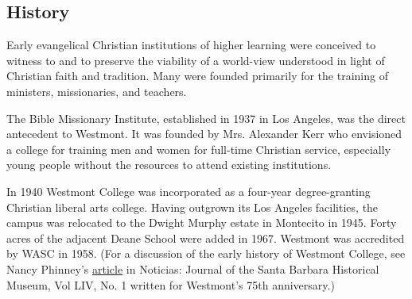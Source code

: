 \subsection{History}

   Early evangelical Christian institutions of higher learning were conceived to witness to and to preserve the viability of a world-view understood in light of Christian faith and tradition. Many were founded primarily for the training of ministers, missionaries, and teachers.

   The Bible Missionary Institute, established in 1937 in Los Angeles, was the direct antecedent to Westmont. It was founded by Mrs. Alexander Kerr who envisioned a college for training men and women for full-time Christian service, especially young people without the resources to attend existing institutions.

   In 1940 Westmont College was incorporated as a four-year degree-granting Christian liberal arts college. Having outgrown its Los Angeles facilities, the campus was relocated to the Dwight Murphy estate in Montecito in 1945. Forty acres of the adjacent Deane School were added in 1967. Westmont was accredited by WASC in 1958. (For a discussion of the early history of Westmont College, see Nancy Phinney's \href{http://www.santabarbaramuseum.com/noticias-article.pdf}{article} in Noticias: Journal of the Santa Barbara Historical Museum, Vol LIV, No. 1  written for Westmont's 75th anniversary.)
   
